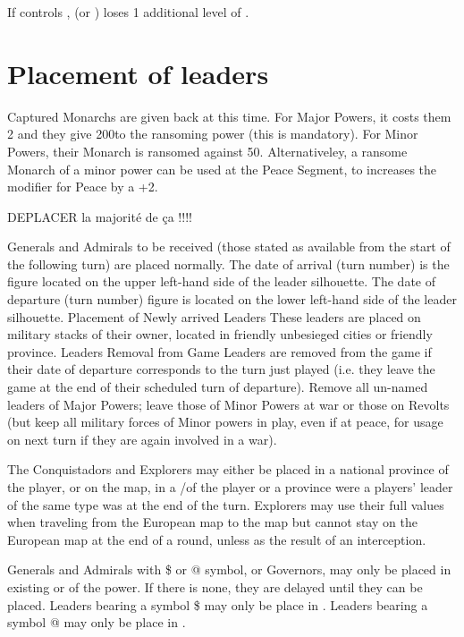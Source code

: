 \aparag[\villeVienne]
If \TUR controls \villeVienne, \HAB (\SPA or \AUS) loses 1 additional level of
\STAB.

\section{Placement of leaders}\label{chInter:Leaders}

Captured Monarchs are given back at this time.
\bparag For Major Powers, it costs them 2 \STAB and they give 200\ducats to
the ransoming power (this is mandatory).
\bparag For Minor Powers, their Monarch is ransomed against 50\ducats.
\bparag Alternativeley, a ransome Monarch of a minor power can be used at the
Peace Segment, to increases the modifier for Peace by a +2.

\begin{todo}
  DEPLACER la majorité de ça !!!!
\end{todo}
\aparag Generals and Admirals to be received (those stated as available from
the start of the following turn) are placed normally.
The date of arrival (turn number) is the figure located on the upper left-hand
side of the leader silhouette.  The date of departure (turn number) figure is
located on the lower left-hand side of the leader silhouette.
\bparag Placement of Newly arrived Leaders These leaders are placed on
military stacks of their owner, located in friendly unbesieged cities or
friendly province.
\bparag Leaders Removal from Game Leaders are removed from the game if their
date of departure corresponds to the turn just played (i.e. they leave the
game at the end of their scheduled turn of departure).
\bparag Remove all un-named leaders of Major Powers; leave those of Minor
Powers at war or those on Revolts (but keep all military forces of Minor
powers in play, even if at peace, for usage on next turn if they are again
involved in a war).

The Conquistadors and Explorers may either be placed in a national province of
the player, or on the \ROTW map, in a \COL/\TP of the player or a province
were a players' leader of the same type was at the end of the turn.
\bparag Explorers may use their full values when traveling from the European
map to the \ROTW map but cannot stay on the European map at the end of a
round, unless as the result of an interception.

Generals and Admirals with \$ or @ symbol, or Governors, may only be placed in
existing \COL or \TP of the power. If there is none, they are delayed until
they can be placed.
\bparag Leaders bearing a symbol \$ may only be place in .
\bparag Leaders bearing a symbol @ may only be place in .



